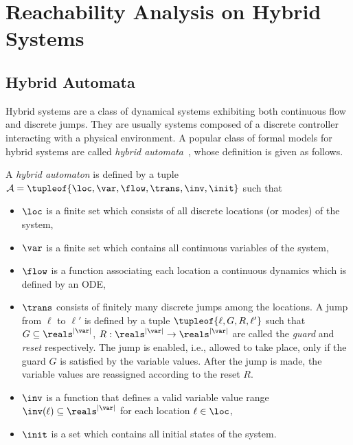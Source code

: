 \section{Reachability Analysis on Hybrid Systems}

\subsection{Hybrid Automata}

Hybrid systems are a class of dynamical systems exhibiting both continuous flow and discrete jumps. They are usually systems composed of a discrete controller interacting with a physical environment. A popular class of formal models for hybrid systems are called \emph{hybrid automata}~\cite{}, whose definition is given as follows.

\begin{defn}
 A \emph{hybrid automaton} is defined by a tuple $\mathcal{A} = \tupleof{\loc, \var, \flow, \trans, \inv, \init}$ such that
 \begin{itemize}[-]
  \item $\loc$ is a finite set which consists of all discrete locations (or modes) of the system,
  
  \item $\var$ is a finite set which contains all continuous variables of the system,
  
  \item $\flow$ is a function associating each location a continuous dynamics which is defined by an ODE,
  
  \item $\trans$ consists of finitely many discrete jumps among the locations. A jump from $\ell$ to $\ell'$ is defined by a tuple $\tupleof{\ell, G, R, \ell'}$ such that $G\subseteq \reals^{|\var|}$, $R: \reals^{|\var|}\rightarrow \reals^{|\var|}$ are called the \emph{guard} and \emph{reset} respectively. The jump is enabled, i.e., allowed to take place, only if the guard $G$ is satisfied by the variable values. After the jump is made, the variable values are reassigned according to the reset $R$.
  
  \item $\inv$ is a function that defines a valid variable value range $\inv(\ell) \subseteq \reals^{|\var|}$ for each location $\ell \in \loc$,
  
  \item $\init$ is a set which contains all initial states of the system.
 \end{itemize}
\end{defn}

